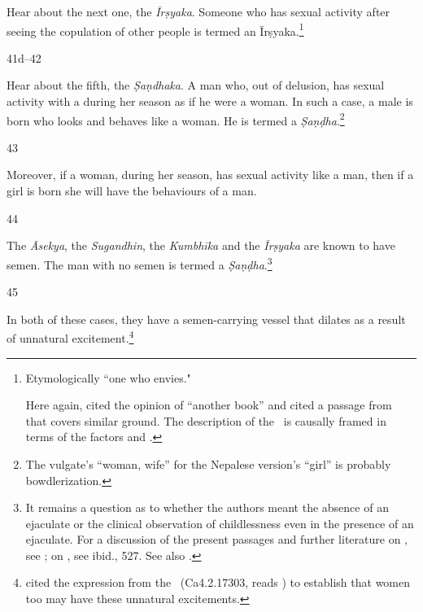 \begin{translation}
Hear about the next one, the \emph{Īrṣyaka}.  
Someone who has sexual activity after seeing the copulation of other people 
is termed an Īrṣyaka.\footnote{Etymologically “one who envies."  
    
    Here again,  cited the opinion of “another 
    book” and cited a passage from \CS\  that covers similar 
    ground.  The description of the \CS\ is causally framed in terms of the 
    factors  and .} 

\item [41d--42]

Hear about the fifth, the \emph{Ṣaṇdhaka}.  A man who, out of
delusion, has sexual activity with a  during
her season as if he were a woman.  In such a case, a male is born who
looks and behaves like a woman.  He is termed a
\emph{Ṣaṇḍha}.\footnote{The vulgate's  “woman, wife” for
the Nepalese version's    “girl” is probably bowdlerization.}
    
\item[43]
    
Moreover, if a woman, during her season, has sexual activity like a man, then 
if a girl is born she will have the behaviours of a man.

\item[44]

The \emph{Āsekya}, the \emph{Sugandhin}, the \emph{Kumbhīka} and the
\emph{Īrṣyaka} are known to have semen.  The man with no semen is
termed a \emph{Ṣaṇḍha}.\footnote{It remains a question as to whether
    the authors meant the absence of an ejaculate or the clinical
    observation of childlessness even in the presence of an ejaculate.
    For a discussion of the present passages and further literature on
    , see \cite[581--584]{das-2003}; on , see ibid.,
    527.  See also \cites[593--597, et 
    passim]{swee-1993}{zwil-2000}{zwil-2010}.}
    
\item [45]

In both of these cases, they have a semen-carrying vessel that
dilates as a result of unnatural
excitement.\footnote{ %
    cited the expression  from the \CS\
    (Ca{4.2.17}{303}, reads ) to establish that women too may
    have these unnatural excitements.
    
}
\end{translation}
